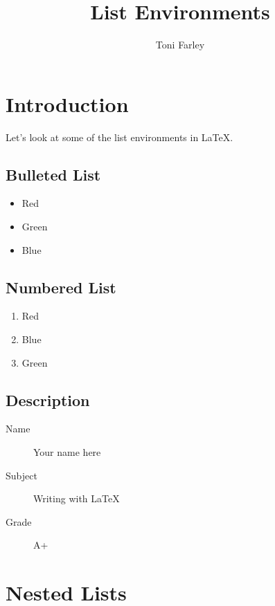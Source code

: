 \documentclass{article}
\title{List Environments}
\author{Toni Farley}
\date{}
\begin{document}
\maketitle

\section{Introduction}

Let's look at some of the list environments in \LaTeX.

\subsection{Bulleted List}

\begin{itemize}
\item Red
\item Green
\item Blue
\end{itemize}

\subsection{Numbered List}

\begin{enumerate}
\item Red
\item Blue
\item Green
\end{enumerate}

\subsection{Description}

\begin{description}
	\item[Name] Your name here
	\item[Subject] Writing with \LaTeX
	\item[Grade] A+
\end{description}

\section{Nested Lists}
\end{document}
